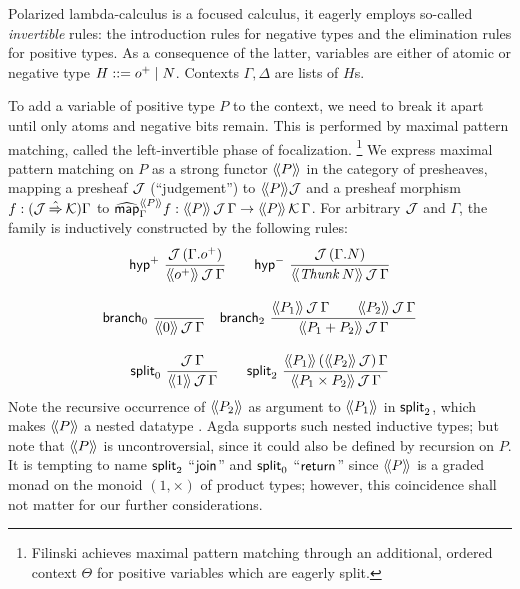 \documentclass[sigplan,screen,fleqn]{acmart}
\begin{document}
Polarized lambda-calculus
\cite{zeilberger:PhD,espiritoSanto:entcs17}
is a focused calculus, it eagerly employs
so-called \emph{invertible} rules: the introduction rules for negative types and the
elimination rules for positive types.  As a consequence of the latter,
variables are either of atomic or negative type $H ::= \patom \mid N$.
Contexts $\Gamma,\Delta$ are lists of $H$s.

To add a variable of positive type $P$ to the context, we need to
break it apart until only atoms and negative bits remain.  This is
performed by maximal pattern matching, called the left-invertible
phase of focalization.%
\footnote{Filinski \cite[Section~4]{filinski:tlca01} achieves maximal pattern
matching through an additional, ordered context $\Theta$ for positive
variables which are eagerly split.}
We express maximal pattern matching on $P$ as a strong functor
$\Add P$ in the category of presheaves,
mapping a presheaf $\J$ (``judgement'') to $\Add P \J$
and a presheaf morphism $f : (\J \hatto \K)\Gamma$ to
$\stmap[\Add P]_\Gamma f : \AddHyp P \J \Gamma \to \AddHyp P \K \Gamma$.
For arbitrary $\J$ and $\Gamma$, the family  is
inductively constructed by the following rules:
\begin{gather*}
  \nru{\phyp}
      {\J\,(\cext \Gamma \patom)}
      {\AddHyp {\patom} \J \Gamma}
\qquad
  \nru{\nhyp}
      {\J\,(\cext \Gamma N)}
      {\AddHyp {\Thunk N} \J \Gamma}
\\[2ex]
  \nru{\nbranch}
      {}
      {\AddHyp {\tyzero} \J \Gamma}
\quad
  \nru{\bbranch}
      {\AddHyp {P_1} \J \Gamma \qquad
       \AddHyp {P_2} \J \Gamma }
      {\AddHyp {P_1 + P_2} \J \Gamma}
\\[2ex]
  \nru{\nsplit}
      {\J\,\Gamma}
      {\AddHyp {\tyone} \J \Gamma}
\qquad
  \nru{\bsplit}
      {\AddHyp {P_1} {\left(\Add{P_2}\,\J\right)} \Gamma}
      {\AddHyp {P_1 \times P_2} \J \Gamma}
\end{gather*}
Note the recursive occurrence of $\Add{P_2}$ as argument to
$\Add{P_1}$ in $\bsplit$, which makes $\Add P$ a nested datatype
\cite{bird:nested}.  Agda supports such nested inductive types; but
note that $\Add{P}$ is uncontroversial, since it could also be defined
by recursion on $P$.   It is tempting to name $\bsplit$
``$\tjoin$'' and $\nsplit$ ``$\treturn$''
since $\Add P$ is a graded monad on the monoid $(1,\times)$
of product types;
however, this coincidence shall not matter for our further considerations.
\end{document}
